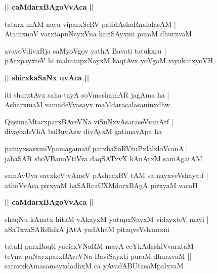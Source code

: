 \documentclass[twoside,12pt,openright]{book}
\newcounter{shloka}[chapter]
\def\uvaca#1{\centerline{{\large\textbf{#1}}}}
\begin{document}
\uvaca{|| caMdarxBAgoVvAca ||}

\begin{shloka}%
tatarx mAM naya viparxSeRV patidAshaRnalalasAM |\\
AtamxnoV varxtapuNeyxVna kariSAyxmi puraM dhurxvaM 
\end{shloka}

\begin{shloka}%
avayoVdivxRja saMyoVgov yathA Bavati tatukxru |\\
pArxpayxteV hi mahatupxNayxM kaqtAvx yoVgaM viyukatxyoVH
\end{shloka}

\uvaca{|| shirxkaSaNx uvAca ||}

\begin{shloka}%
iti shurxtAvx saha tayA soVmashamAR jagAma ha |\\
AsharxmaM vamadeVvasayx maMdaracalasaninxdhw
\end{shloka}

\begin{shloka}%
QusimaMtarxparxBAveVNa viSuNxvAsaraseVvanAtf |\\
divayxdeVhA baBuvAsw divAyxM gatimavApa ha
\end{shloka}

\begin{shloka}%
patuyxsasxmiVpamagamatf parxhaSoRVtuPxlalxloVcanA |\\
jahaSAR shoVBanoVtiVva daqSATxvX kAnAtxM samAgatAM 
\end{shloka}

\begin{shloka}%
samAyUya savxkeV vAmeV pAshecxRV tAM sa nayxveVshayatf |\\
athoVvAca pirxyaM haSARcaCXMdarxBAgA pirxyaM vacaH
\end{shloka}

\uvaca{|| caMdarxBAgoVvAca ||}

\begin{shloka}%
shaqNu kAnatx hitaM vAkayxM yutupxNayxM vidayxteV mayi |\\
aSaTxvaSARdhikA jAtA yadAhaM pitaqveVshamxni
\end{shloka}

\begin{shloka}%
tataH parxBaqti yacicxVNaRM mayA ceYkAdashiVvarxtaM |\\
teVna puNayxparxBAveVNa BaviSayxti puraM dhurxvaM ||\\
saravxkAmasamayxdadhxM ca yAvadABUtasaMpalxvaM
\end{shloka}
\end{document}

